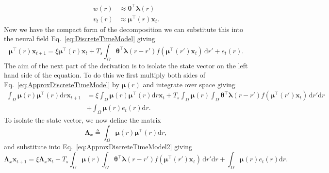 \documentclass[review,authoryear,3p]{elsarticle}
\begin{document}
\begin{align}
	w\left(r\right) &\approx \boldsymbol\theta^\top\boldsymbol\lambda\left(r\right) 
	\label{eq:KernelFiniteExpansion} \\
	v_t\left(r\right) &\approx \boldsymbol\mu^\top\left(r\right)\mathbf{x}_t.
	\label{eq:FieldFiniteExpansion}
\end{align}
Now we have the compact form of the decomposition we can substitute this into the neural field Eq.~\eqref{eq:DiscreteTimeModel} giving
\begin{equation}\label{eq:ApproxDiscreteTimeModel}
	\boldsymbol\mu^\top\left(r\right)\mathbf{x}_{t+1} = 
	\xi \boldsymbol\mu^\top\left(r\right)\mathbf{x}_t + 
	T_s \int_\Omega { 
	    \boldsymbol\theta^\top\boldsymbol\lambda\left(r-r'\right)
	    f\left(\boldsymbol\mu^\top\left(r'\right)\mathbf{x}_t\right) 
	\, \mathrm{d}r'}  
	+ e_t\left(r\right).
\end{equation}
The aim of the next part of the derivation is to isolate the state vector on the left hand side of the equation. To do this we first multiply both sides of Eq.~\eqref{eq:ApproxDiscreteTimeModel} by $\boldsymbol\mu\left(r\right)$ and integrate over space giving 
\begin{align}\label{eq:ApproxDiscreteTimeModel2}
	\int_{\Omega} \boldsymbol\mu\left(r\right)\boldsymbol\mu^\top\left(r\right) \mathrm{d}r \mathbf{x}_{t+1} &= 
	\xi \int_{\Omega}\boldsymbol\mu\left(r\right)\boldsymbol\mu^\top\left(r\right) \mathrm{d}r \mathbf{x}_t + 
	T_s \int_{\Omega}\boldsymbol\mu\left(r\right)\int_\Omega { 
	    \boldsymbol\theta^\top\boldsymbol\lambda\left(r-r'\right)
	    f\left(\boldsymbol\mu^\top\left(r'\right)\mathbf{x}_t\right) 
	\, \mathrm{d}r'\mathrm{d}r}  \nonumber\\
	&+ \int_{\Omega}\boldsymbol\mu\left(r\right)e_t\left(r\right)\mathrm{d}r.
\end{align}
To isolate the state vector, we now define the matrix 
\begin{equation}
	\label{eq:Lambdax}
	 \mathbf{\Lambda}_{x} \triangleq \int_{\Omega}\boldsymbol{\mu}\left(r\right)\boldsymbol{\mu}^\top\left(r\right) \mathrm{d}r,
\end{equation}
and substitute into Eq.~\eqref{eq:ApproxDiscreteTimeModel2} giving
\begin{equation}\label{eq:ApproxDiscreteTimeModel3}
	\mathbf{\Lambda}_{x} \mathbf{x}_{t+1} = 
	\xi \mathbf{\Lambda}_{x} \mathbf{x}_t + 
	T_s \int_{\Omega}\boldsymbol\mu\left(r\right)\int_\Omega { 
	    \boldsymbol\theta^\top\boldsymbol\lambda\left(r-r'\right)
	    f\left(\boldsymbol\mu^\top\left(r'\right)\mathbf{x}_t\right) 
	\, \mathrm{d}r'\mathrm{d}r}  
	+ \int_{\Omega}\boldsymbol{\mu}\left(r\right) e_t\left(r\right) \mathrm{d}r.
\end{equation}
\end{document}
